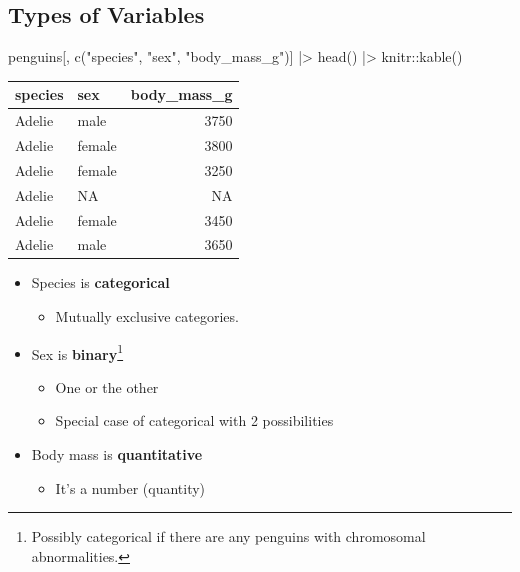 \documentclass[
  letterpaper,
  DIV=11,
  numbers=noendperiod,
  oneside]{scrreprt}
\newenvironment{Shaded}{\begin{snugshade}}{\end{snugshade}}
\newcommand{\FunctionTok}[1]{\textcolor[rgb]{0.28,0.35,0.67}{#1}}
\newcommand{\NormalTok}[1]{\textcolor[rgb]{0.00,0.23,0.31}{#1}}
\newcommand{\SpecialCharTok}[1]{\textcolor[rgb]{0.37,0.37,0.37}{#1}}
\newcommand{\StringTok}[1]{\textcolor[rgb]{0.13,0.47,0.30}{#1}}
\providecommand{\tightlist}{%
  \setlength{\itemsep}{0pt}\setlength{\parskip}{0pt}}\usepackage{longtable,booktabs,array}
\begin{document}
\hypertarget{types-of-variables}{%
\subsection{Types of Variables}\label{types-of-variables}}

\begin{Shaded}
\begin{Highlighting}[]
\NormalTok{penguins[, }\FunctionTok{c}\NormalTok{(}\StringTok{"species"}\NormalTok{, }\StringTok{"sex"}\NormalTok{, }\StringTok{"body\_mass\_g"}\NormalTok{)] }\SpecialCharTok{|\textgreater{}}
    \FunctionTok{head}\NormalTok{() }\SpecialCharTok{|\textgreater{}}
\NormalTok{    knitr}\SpecialCharTok{::}\FunctionTok{kable}\NormalTok{()}
\end{Highlighting}
\end{Shaded}

\begin{longtable}[]{@{}llr@{}}
\toprule\noalign{}
species & sex & body\_mass\_g \\
\midrule\noalign{}
\endhead
\bottomrule\noalign{}
\endlastfoot
Adelie & male & 3750 \\
Adelie & female & 3800 \\
Adelie & female & 3250 \\
Adelie & NA & NA \\
Adelie & female & 3450 \\
Adelie & male & 3650 \\
\end{longtable}

\begin{itemize}
\tightlist
\item
  Species is \textbf{categorical}

  \begin{itemize}
  \tightlist
  \item
    Mutually exclusive categories.
  \end{itemize}
\item
  Sex is \textbf{binary}\footnote{Possibly categorical if there are any
    penguins with chromosomal abnormalities.}

  \begin{itemize}
  \tightlist
  \item
    One or the other
  \item
    Special case of categorical with 2 possibilities
  \end{itemize}
\item
  Body mass is \textbf{quantitative}

  \begin{itemize}
  \tightlist
  \item
    It's a number (quantity)
  \end{itemize}
\end{itemize}
\end{document}
